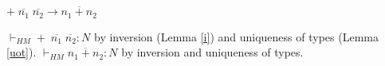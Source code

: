 \begin{case}
$+\;\overline{n_{1}}\;\overline{n_{2}}\rightarrow\overline{n_{1}+n_{2}}$

$\vdash_{HM}+\;\overline{n_{1}}\;\overline{n_{2}}:N$ by inversion (Lemma \ref{i}) and uniqueness of types (Lemma \ref{uot}).  $\vdash_{HM}\overline{n_{1}+n_{2}}:N$ by inversion and uniqueness of types.
\end{case}